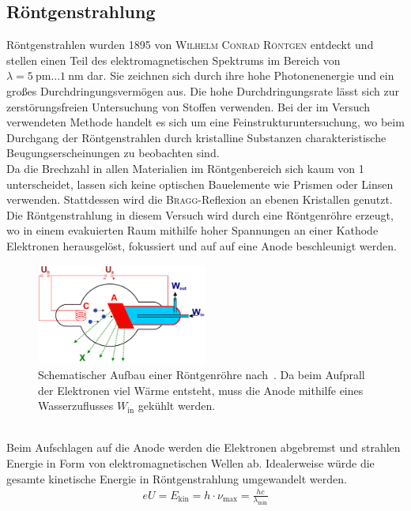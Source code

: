 \documentclass[a4paper,twoside,final]{article}
\begin{document}
\subsection{Röntgenstrahlung}
Röntgenstrahlen wurden 1895 von \textsc{Wilhelm Conrad Röntgen} entdeckt und stellen einen Teil des elektromagnetischen Spektrums im Bereich von $\lambda = \SI{5}{\pico \metre}\hdots \SI{1}{\nano\metre}$ dar. Sie zeichnen sich durch ihre hohe Photonenenergie und ein großes Durchdringungsvermögen aus. Die hohe Durchdringungsrate lässt sich zur zerstörungsfreien Untersuchung von Stoffen verwenden. Bei der im Versuch verwendeten Methode handelt es sich um eine Feinstrukturuntersuchung, wo beim Durchgang der Röntgenstrahlen durch kristalline Substanzen charakteristische Beugungserscheinungen zu beobachten sind.\\
Da die Brechzahl in allen Materialien im Röntgenbereich sich kaum von 1 unterscheidet, lassen sich keine optischen Bauelemente wie Prismen oder Linsen verwenden. Stattdessen wird die \textsc{Bragg}-Reflexion an ebenen Kristallen genutzt.\\
Die Röntgenstrahlung in diesem Versuch wird durch eine Röntgenröhre erzeugt, wo in einem evakuierten Raum mithilfe hoher Spannungen an einer Kathode Elektronen herausgelöst, fokussiert und auf auf eine Anode beschleunigt werden.
\begin{figure}[htp]
    \centering
    \includegraphics[width=0.5\textwidth]{Abbildungen/WaterCooledXrayTube.pdf}
    \caption{Schematischer Aufbau einer Röntgenröhre nach~\cite{Roentgenroehre}. Da beim Aufprall der Elektronen viel Wärme entsteht, muss die Anode mithilfe eines Wasserzuflusses $W_\text{in}$ gekühlt werden.}
    \label{fig:Roentgenroehre}
\end{figure}\\
Beim Aufschlagen auf die Anode werden die Elektronen abgebremst und strahlen Energie in Form von elektromagnetischen Wellen ab. Idealerweise würde die gesamte kinetische Energie in Röntgenstrahlung umgewandelt werden.
\begin{align}
  e U = E_\text{kin} = h \cdot \nu_\text{max} = \frac{hc}{\lambda_\text{min}}
\end{align}
\end{document}
